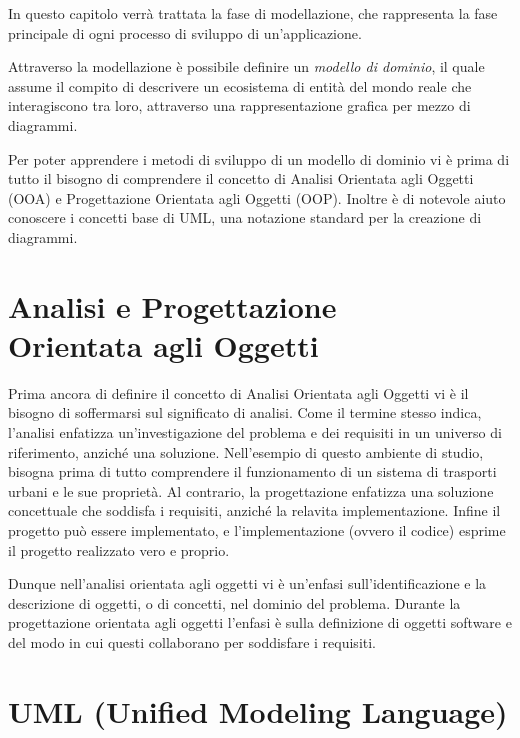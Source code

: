 In questo capitolo verrà trattata la fase di modellazione, che rappresenta la fase principale di ogni processo di sviluppo di un'applicazione.

Attraverso la modellazione è possibile definire un {\itshape modello di dominio}, il quale assume il compito di descrivere un ecosistema di entità del mondo reale che interagiscono tra loro, attraverso una rappresentazione grafica per mezzo di diagrammi.

Per poter apprendere i metodi di sviluppo di un modello di dominio vi è prima di tutto il bisogno di comprendere il concetto di Analisi Orientata agli Oggetti (OOA) e Progettazione Orientata agli Oggetti (OOP). Inoltre è di notevole aiuto conoscere i concetti base di UML, una notazione standard per la creazione di diagrammi.

\section{Analisi e Progettazione \\ Orientata agli Oggetti} %
\label{sec:analisi_orientata_agli_oggetti}

Prima ancora di definire il concetto di Analisi Orientata agli Oggetti vi è il bisogno di soffermarsi sul significato di analisi.
Come il termine stesso indica, l'analisi enfatizza un'investigazione del problema e dei requisiti in un universo di riferimento, anziché una soluzione. Nell'esempio di questo ambiente di studio, bisogna prima di tutto comprendere il funzionamento di un sistema di trasporti urbani e le sue proprietà.
Al contrario, la progettazione enfatizza una soluzione concettuale che soddisfa i requisiti, anziché la relavita implementazione. Infine il progetto può essere implementato, e l'implementazione (ovvero il codice) esprime il progetto realizzato vero e proprio.

Dunque nell'analisi orientata agli oggetti vi è un'enfasi sull'identificazione e la descrizione di oggetti, o di concetti, nel dominio del problema. Durante la progettazione orientata agli oggetti l'enfasi è sulla definizione di oggetti software e del modo in cui questi collaborano per soddisfare i requisiti.

\section{UML (Unified Modeling Language)} %
\label{sec:uml_}

